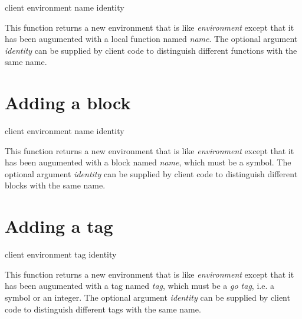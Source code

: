  {client environment name \optional identity}

This function returns a new environment that is like
\textit{environment} except that it has been augumented with a local
function named \textit{name}.  The optional argument \textit{identity}
can be supplied by client code to distinguish different functions with
the same name.

\section{Adding a block}

 {client environment name \optional identity}

This function returns a new environment that is like
\textit{environment} except that it has been augumented with a block
named \textit{name}, which must be a symbol.  The optional argument
\textit{identity} can be supplied by client code to distinguish
different blocks with the same name.

\section{Adding a tag}

 {client environment tag \optional identity}

This function returns a new environment that is like
\textit{environment} except that it has been augumented with a tag
named \textit{tag}, which must be a \emph{go tag}, i.e. a symbol or an
integer.  The optional argument \textit{identity} can be supplied by
client code to distinguish different tags with the same name.
